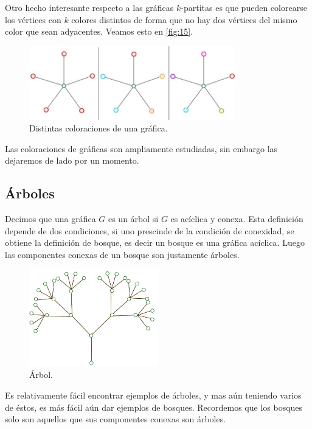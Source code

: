 Otro hecho interesante respecto a las gráficas $k$-partitas es que pueden
colorearse los vértices con $k$ colores distintos de forma que no hay dos
vértices del mismo color que sean adyacentes. Veamos esto en \cref{fig:15}.

\begin{figure}[H]
  \centering
  \includegraphics[width=0.8\textwidth]{recursos/capturas/15.jpg}
  \caption{Distintas coloraciones de una gráfica.}
  \label{fig:13}
\end{figure}

Las coloraciones de gráficas son ampliamente estudiadas, sin embargo las
dejaremos de lado por un momento.

\subsection{\'Arboles}
Decimos que una gráfica $G$ es un árbol si $G$ es acíclica y conexa. Esta
definición depende de dos condiciones, si uno prescinde de la condición de
conexidad, se obtiene la definición de bosque, es decir un bosque es una gráfica
acíclica. Luego las componentes conexas de un bosque son justamente árboles.

\begin{figure}[H]
  \centering
  \includegraphics[width=0.5\textwidth]{recursos/capturas/16.jpg}
  \caption{Árbol.}
  \label{fig:14}
\end{figure}

Es relativamente fácil encontrar ejemplos de árboles, y mas aún teniendo varios
de éstos, es más fácil aún dar ejemplos de bosques. Recordemos que los bosques
solo son aquellos que sus componentes conexas son árboles.

